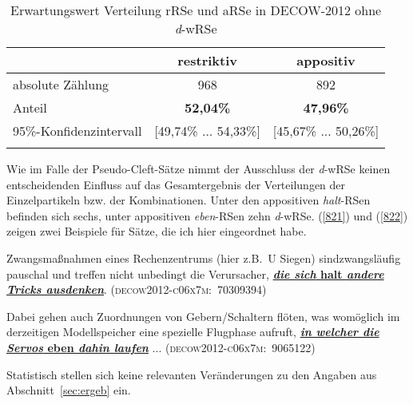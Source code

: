 \begin{table}
	\caption{\label{tab:820}Erwartungswert Verteilung rRSe und aRSe in DECOW-2012 ohne \textit{d}-wRSe}
 		\begin{tabular}[t]{lcc} 
 		\lsptoprule	
   	 	& {restriktiv} & {appositiv} \\
   	 	\midrule 
  		absolute Zählung & 968 & 892\\ 
   		Anteil & \textbf{52,04\%} & \textbf{47,96\%}\\
   		95\%-Konfidenzintervall & [49,74\% ... 54,33\%] & [45,67\% ... 50,26\%] \\
		\lsptoprule
 		\end{tabular}
\end{table}
Wie im Falle der Pseudo-Cleft-Sätze nimmt der Ausschluss der \textit{d}-wRSe keinen entscheidenden Einfluss auf das Gesamtergebnis der Verteilungen der Einzelpartikeln bzw. der Kombinationen. Unter den appositiven \textit{halt}-RSen befinden sich sechs, unter appositiven \textit{eben}-RSen zehn \textit{d}-wRSe. (\ref{821}) und (\ref{822}) zeigen zwei Beispiele für Sätze, die ich hier eingeordnet habe.

\begin{exe}
	\ex\label{821} 

	Zwangsmaßnahmen eines Rechenzentrums (hier z.B.\ U Siegen) sind\linebreak zwangsläufig pauschal und treffen nicht unbedingt die Verursacher, \ul{\textbf{\textit{die sich} halt \textit{andere Tricks ausdenken}}}.
	\hbox{}\hfill\hbox{\scshape(decow2012-c06x7m: 70309394)}
\end{exe}

 \begin{exe}
	\ex\label{822} 

	Dabei gehen auch Zuordnungen von Gebern/Schaltern flöten, was womöglich im derzeitigen Modellspeicher eine spezielle Flugphase aufruft, \ul{\textbf{\textit{in welcher die Servos} eben \textit{dahin laufen}}} ...
	\newline
	\hbox{}\hfill\hbox{\scshape(decow2012-c06x7m: 9065122)}
\end{exe}                                                           				                         
Statistisch stellen sich keine relevanten Veränderungen zu den Angaben aus Abschnitt~\ref{sec:ergeb} ein.

